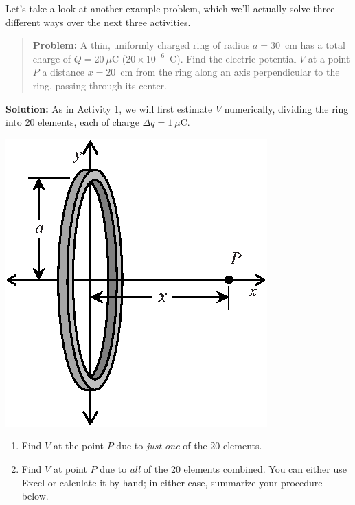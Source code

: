 \begin{minipage}{0.65\textwidth}
Let's take a look at another example problem, which we'll actually solve three different ways over the next three activities.  

\begin{quote}
\textbf{Problem:} A thin, uniformly charged ring of radius $a=30$~cm has a total charge of $Q = 20\ \mu$C ($20
\times 10^{-6}$~C). Find the electric potential $V$ at a point $P$ a distance $x = 20$~cm from the ring along an axis perpendicular to the ring, passing through its center.
\end{quote}

\textbf{Solution:} As in Activity 1, we will first estimate $V$ numerically, dividing the ring into 20 elements, each of charge $\Delta q = 1\ \mu$C.

\end{minipage}
\begin{minipage}{0.34\textwidth}
\vspace{-0.3in}
\raggedleft \includegraphics[scale=0.9]{potential_charge_distributions/ring_integral.eps}
\end{minipage}

\begin{enumerate}[wide, label=(\emph{\alph*})]

\item Find $V$ at the point $P$ due to \textit{just one} of the 20 elements.
\answerspace{0.4in}

\item Find $V$ at  point $P$ due to \textit{all} of the 20 elements combined.  You can either use Excel or calculate it by hand; in either case, summarize your procedure below.
\answerspace{0.7in}

\end{enumerate}

